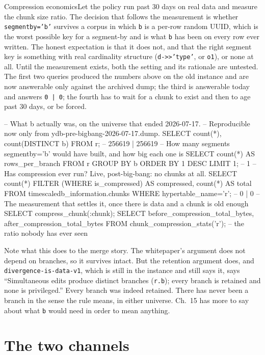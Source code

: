 \begin{Open}{Compression economics}{Let the policy run past 30 days on real data and measure the chunk size ratio.}
The decision that follows the measurement is whether \texttt{segmentby='b'} survives a corpus in which \texttt{b} is a per-row random UUID, which is the worst possible key for a segment-by and is what \texttt{b} has been on every row ever written.
The honest expectation is that it does not, and that the right segment key is something with real cardinality structure (\texttt{d->>'type'}, or \texttt{o1}), or none at all. Until the measurement exists, both the setting and its rationale are untested. The first two queries produced the numbers above on the old instance and are now answerable only against the archived dump; the third is answerable today and answers \texttt{0 | 0}; the fourth has to wait for a chunk to exist and then to age past 30 days, or be forced.
\begin{Check}
-- What b actually was, on the universe that ended 2026-07-17.
-- Reproducible now only from ydb-pre-bigbang-2026-07-17.dump.
SELECT count(*), count(DISTINCT b) FROM r;                   -- 256619 | 256619
-- How many segments segmentby='b' would have built, and how big each one is
SELECT count(*) AS rows_per_branch FROM r GROUP BY b ORDER BY 1 DESC LIMIT 1;   -- 1
-- Has compression ever run? Live, post-big-bang: no chunks at all.
SELECT count(*) FILTER (WHERE is_compressed) AS compressed,
       count(*) AS total
  FROM timescaledb_information.chunks WHERE hypertable_name='r';   -- 0 | 0
-- The measurement that settles it, once there is data and a chunk is old enough
SELECT compress_chunk(:chunk);
SELECT before_compression_total_bytes, after_compression_total_bytes
  FROM chunk_compression_stats('r');   -- the ratio nobody has ever seen
\end{Check}
\end{Open}

Note what this does to the merge story. The whitepaper's argument does not depend on branches, so it survives intact. But the retention argument does, and \texttt{divergence-is-data-v1}, which is still in the instance and still says it, says ``Simultaneous edits produce distinct branches (\texttt{r.b}); every branch is retained and none is privileged.'' Every branch was indeed retained. There has never been a branch in the sense the rule means, in either universe. Ch.~15 has more to say about what \texttt{b} would need in order to mean anything.

\section{The two channels}

